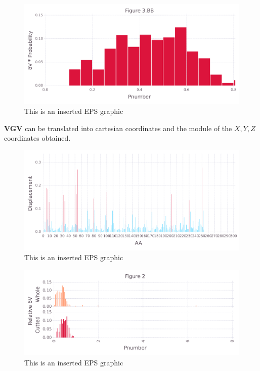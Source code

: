 \documentclass[10pt,letterpaper]{article}
\begin{document}
\begin{figure}[ht]
\begin{center}
\includegraphics[scale=0.5]{1prn/3bbfigure_hi-precision.pdf}
\caption{This is an inserted EPS graphic}
\label{fig11}
\end{center}
\end{figure}

\FloatBarrier


\textbf{VGV} can be translated into cartesian coordinates and the module of the \(X, Y, Z\) coordinates obtained.

\begin{figure}[ht]
\begin{center}
\includegraphics[scale=0.5]{1prn/5figure_hi-precision.pdf}
\caption{This is an inserted EPS graphic}
\label{fig13}
\end{center}
\end{figure}

\begin{figure}[ht]
\begin{center}
\includegraphics[scale=0.5]{1prn/3both_figure_hi-precision.pdf}
\caption{This is an inserted EPS graphic}
\label{fig13}
\end{center}
\end{figure}
\end{document}
